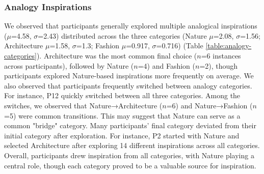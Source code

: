 \documentclass[sigconf, screen]{acmart}
\begin{document}
\subsubsection{Analogy Inspirations}
We observed that participants generally explored multiple analogical inspirations ($\mu$=4.58, $\sigma$=2.43) distributed across the three categories (Nature $\mu$=2.08, $\sigma$=1.56; Architecture $\mu$=1.58, $\sigma$=1.3; Fashion $\mu$=0.917, $\sigma$=0.716) (Table \ref{table:analogy-categories}). Architecture was the most common final choice ($n$=6 instances across participants), followed by Nature ($n$=4) and Fashion ($n$=2), though participants explored Nature-based inspirations more frequently on average.
We also observed that participants frequently switched between analogy categories.
For instance, P12 quickly switched between all three categories.
Among the switches, we observed that Nature→Architecture ($n$=6) and Nature→Fashion ($n$=5) were common transitions. This may suggest that Nature can serve as a common "bridge" category.
Many participants' final category deviated from their initial category after exploration. For instance, P2 started with Nature and selected Architecture after exploring 14 different inspirations across all categories.
Overall, participants drew inspiration from all categories, with Nature playing a central role, though each category proved to be a valuable source for inspiration.
\end{document}
